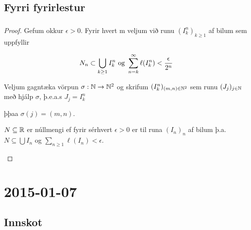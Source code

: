 \documentclass[12pt]{book} \usepackage[utf8]{inputenc}
\begin{document}
\section{Fyrri fyrirlestur}

\subsection{}
\begin{proof}

  Gefum okkur $\epsilon > 0$. Fyrir hvert m veljum við runu
  $(I^n_k)_{k \geq 1}$ af bilum sem uppfyllir

  \[N_n \subset \bigcup_{k \geq 1} I_k^n \text{ og } \sum_{n = {k}}^{\infty}
  \ell(I^n_k) < \frac{\epsilon}{2^n}\]

  Veljum gagntæka vörpun $\sigma: \mathbb{N} \to \mathbb{N}^2$ og skrifum
  $(I^n_k)_{(m,n) \in \mathbb{N}^2}$ sem runu $(J_j)_{j \in \mathbb{N}}$ með hjálp
  $\sigma$, þ.e.a.s $J_j = I^n_k$

  þþaa $\sigma (j) = (m,n)$.

\begin{ath}
  $N \subseteq \mathbb{R}$ er núllmengi ef fyrir sérhvert $\epsilon > 0$ er
  til runa $(I_n)_{n}$ af bilum þ.a.  $N \subseteq \bigcup I_n$ og
  $\sum_{n \geq 1} \ell(I_n) < \epsilon$.

\end{ath}
\end{proof}
\chapter{2015-01-07}

\section*{Innskot}
\end{document}
